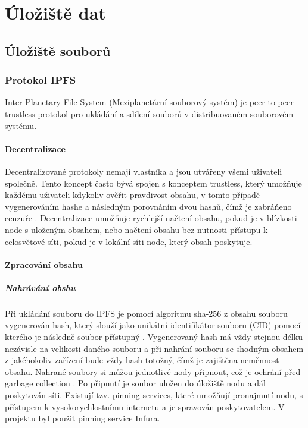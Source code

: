 \documentclass[12pt, a4paper,
 twoside,        %
 openright
]{report}
\begin{document}
\chapter{Úložiště dat}
    \section{Úložiště souborů}
        \subsection{Protokol IPFS}\label{subsection:IPFS}
        Inter Planetary File System (Meziplanetární souborový systém) je peer-to-peer trustless protokol pro ukládání a sdílení souborů v distribuovaném souborovém systému. \cite{IPFSDocs}
        \subsubsection{Decentralizace}
            Decentralizované protokoly nemají vlastníka a jsou utvářeny všemi uživateli společně. Tento koncept často bývá spojen s konceptem trustless, který umožňuje každému uživateli kdykoliv ověřit pravdivost obsahu, v tomto případě vygenerováním hashe a následným porovnáním dvou hashů, čímž je zabráňeno cenzuře \cite{decentralizedVsTrustless}. Decentralizace umožňuje rychlejší načtení obsahu, pokud je v blízkosti node s uloženým obsahem, nebo načtení obsahu bez nutnosti přístupu k celosvětové síti, pokud je v lokální síti node, který obsah poskytuje. \cite{decentralizedAndDistributedNetworks}\cite{decentralizedAndTrustless}
        \subsubsection{Zpracování obsahu}
            \paragraph{Nahrávání obshu}
            Při ukládání souboru do IPFS je pomocí algoritmu sha-256 z obsahu souboru vygenerován hash, který slouží jako unikátní identifikátor souboru (CID) pomocí kterého je následně soubor přístupný \cite{IPFScontentAddressing}. Vygenerovaný hash má vždy stejnou délku nezávisle na velikosti daného souboru a při nahrání souboru se shodným obsahem z jakéhokoliv zařízení bude vždy hash totožný, čímž je zajištěna neměnnost obsahu. Nahrané soubory si můžou jednotlivé nody připnout, což je ochrání před garbage collection \cite{IPFSPersistence}. Po připnutí je soubor uložen do úložiště nodu a dál poskytován síti. Existují tzv. pinning services, které umožňují pronajmutí nodu, s přístupem k vysokorychlostnímu internetu a je spravován poskytovatelem. V projektu byl použit pinning service Infura. 
\end{document}
